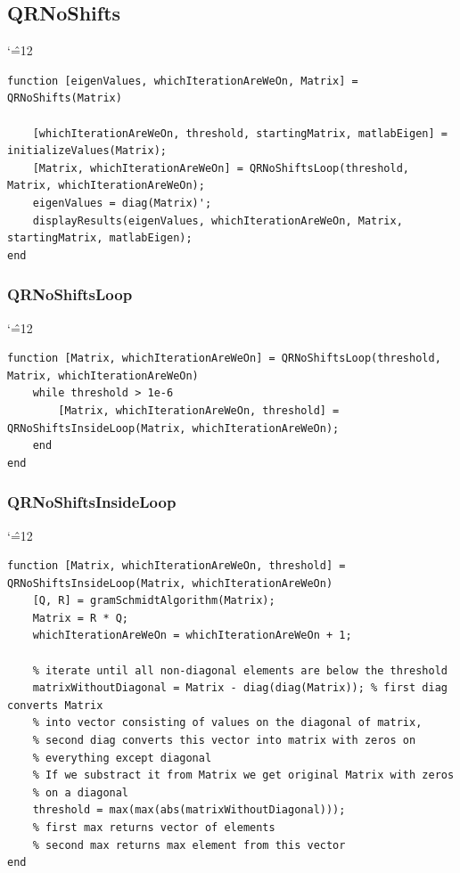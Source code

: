 \documentclass[12pt]{report}
\newenvironment{simplechar}{%
   \catcode`\^=12
}{}
\begin{document}
\subsection{QRNoShifts}
\begin{simplechar}
\begin{lstlisting}
function [eigenValues, whichIterationAreWeOn, Matrix] = QRNoShifts(Matrix)

    [whichIterationAreWeOn, threshold, startingMatrix, matlabEigen] = initializeValues(Matrix);
    [Matrix, whichIterationAreWeOn] = QRNoShiftsLoop(threshold, Matrix, whichIterationAreWeOn);
    eigenValues = diag(Matrix)';
    displayResults(eigenValues, whichIterationAreWeOn, Matrix, startingMatrix, matlabEigen);
end
\end{lstlisting}
\end{simplechar}

\subsubsection{QRNoShiftsLoop}
\begin{simplechar}
\begin{lstlisting}
function [Matrix, whichIterationAreWeOn] = QRNoShiftsLoop(threshold, Matrix, whichIterationAreWeOn)
    while threshold > 1e-6
        [Matrix, whichIterationAreWeOn, threshold] = QRNoShiftsInsideLoop(Matrix, whichIterationAreWeOn);
    end
end
\end{lstlisting}
\end{simplechar}

\subsubsection{QRNoShiftsInsideLoop}
\begin{simplechar}
\begin{lstlisting}
function [Matrix, whichIterationAreWeOn, threshold] = QRNoShiftsInsideLoop(Matrix, whichIterationAreWeOn)
    [Q, R] = gramSchmidtAlgorithm(Matrix);
    Matrix = R * Q;
    whichIterationAreWeOn = whichIterationAreWeOn + 1;

    % iterate until all non-diagonal elements are below the threshold
    matrixWithoutDiagonal = Matrix - diag(diag(Matrix)); % first diag converts Matrix
    % into vector consisting of values on the diagonal of matrix,
    % second diag converts this vector into matrix with zeros on
    % everything except diagonal
    % If we substract it from Matrix we get original Matrix with zeros
    % on a diagonal
    threshold = max(max(abs(matrixWithoutDiagonal)));
    % first max returns vector of elements
    % second max returns max element from this vector
end
\end{lstlisting}
\end{simplechar}
\end{document}
